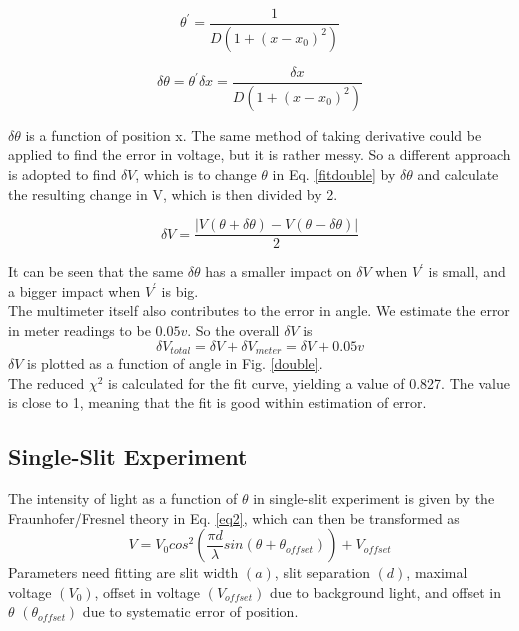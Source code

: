 \documentclass[prb,preprint]{revtex4-1}
\begin{document}
\begin{equation}
\theta^\prime = \frac{1}{D(1+(x-x_0)^2)}
\label{thetaprime}
\end{equation}

\begin{equation}
\delta\theta = \theta^\prime \delta x = \frac{\delta x}{D(1+(x-x_0)^2)}
\label{deltatheta}
\end{equation}

$\delta\theta$ is a function of position x. The same method of taking derivative could be applied to find the error in voltage, but it is rather messy. So a different approach is adopted to find $\delta V$, which is to change $\theta$ in Eq. \ref{fitdouble} by $\delta\theta$ and calculate the resulting change in V, which is then divided by 2.

\begin{equation}
\delta V = \frac{\left| V(\theta+\delta\theta)-V(\theta-\delta\theta)\right |}{2}
\label{deltav}
\end{equation}

It can be seen that the same $\delta\theta$ has a smaller impact on $\delta V$ when $V^\prime$ is small, and a bigger impact when $V^\prime$ is big.\\

The multimeter itself also contributes to the error in angle. We estimate the error in meter readings to be $0.05v$.
So the overall $\delta V$ is
\begin{equation}
\delta V_{total} = \delta V+\delta V_{meter} = \delta V + 0.05v
\label{deltavtotal}
\end{equation}
$\delta V$ is plotted as a function of angle in Fig. \ref{double}.\\

The reduced $\chi^2$ is calculated for the fit curve, yielding a value of 0.827. The value is close to 1, meaning that the fit is good within estimation of error. \\

\subsection{Single-Slit Experiment}

The intensity of light as a function of $\theta$ in single-slit experiment is given by the Fraunhofer/Fresnel theory in Eq. \ref{eq2}, which can then be transformed as
\begin{equation}
V=V_0 cos^2(\frac{\pi d}{\lambda} sin (\theta+\theta_{offset})) + V_{offset}
\label{fitsingle}
\end{equation}
Parameters need fitting are slit width $(a)$, slit separation $(d)$, maximal voltage $(V_0)$, offset in voltage $(V_{offset})$ due to background light, and offset in $\theta$ $(\theta_{offset})$ due to systematic error of position.\\
\end{document}
